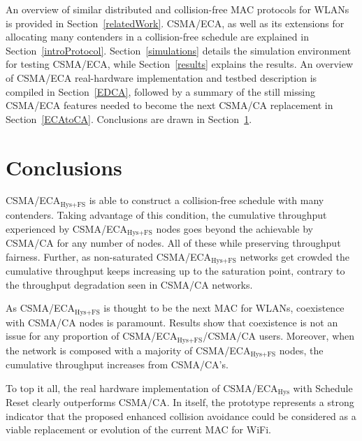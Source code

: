 \documentclass[a4paper,journal]{IEEEtran}
\begin{document}
An overview of similar distributed and collision-free MAC protocols for WLANs is provided in Section~\ref{relatedWork}. CSMA/ECA, as well as its extensions for allocating many contenders in a collision-free schedule are explained in Section~\ref{introProtocol}. Section~\ref{simulations} details the simulation environment for testing CSMA/ECA, while Section~\ref{results} explains the results. An overview of CSMA/ECA real-hardware implementation and testbed description is compiled in Section~\ref{EDCA}, followed by a summary of the still missing CSMA/ECA features needed to become the next CSMA/CA replacement in Section~\ref{ECAtoCA}. Conclusions are drawn in Section~\ref{conclusions}.










\section{Conclusions}\label{conclusions}
CSMA/ECA$_{\text{Hys+FS}}$ is able to construct a collision-free schedule with many contenders. Taking advantage of this condition, the cumulative throughput experienced by CSMA/ECA$_{\text{Hys+FS}}$ nodes goes beyond the achievable by CSMA/CA for any number of nodes. All of these while preserving throughput fairness. Further, as non-saturated CSMA/ECA$_{\text{Hys+FS}}$ networks get crowded the cumulative throughput keeps increasing up to the saturation point, contrary to the throughput degradation seen in CSMA/CA networks.

As CSMA/ECA$_{\text{Hys+FS}}$ is thought to be the next MAC for WLANs, coexistence with CSMA/CA nodes is paramount. Results show that coexistence is not an issue for any proportion of CSMA/ECA$_{\text{Hys+FS}}$/CSMA/CA users. Moreover, when the network is composed with a majority of CSMA/ECA$_{\text{Hys+FS}}$ nodes, the cumulative throughput increases from CSMA/CA's.

To top it all, the real hardware implementation of CSMA/ECA$_{\text{Hys}}$ with Schedule Reset clearly outperforms CSMA/CA. In itself, the prototype represents a strong indicator that the proposed enhanced collision avoidance could be considered as a viable replacement or evolution of the current MAC for WiFi.




\end{document}
